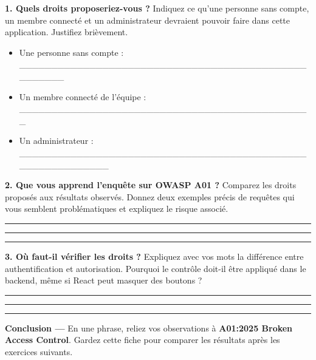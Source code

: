 \documentclass[
  french,
  10pt,
  a4paper,
]{article}
\providecommand{\tightlist}{%
  \setlength{\itemsep}{0pt}\setlength{\parskip}{0pt}}
\begin{document}
\textbf{1. Quels droits proposeriez-vous ?} Indiquez ce qu'une personne
sans compte, un membre connecté et un administrateur devraient pouvoir
faire dans cette application. Justifiez brièvement.

\begin{itemize}
\tightlist
\item
  Une personne sans compte :
  \_\_\_\_\_\_\_\_\_\_\_\_\_\_\_\_\_\_\_\_\_\_\_\_\_\_\_\_\_\_\_\_\_\_\_\_\_\_\_\_\_\_\_\_\_\_\_\_\_\_\_\_
\item
  Un membre connecté de l'équipe :
  \_\_\_\_\_\_\_\_\_\_\_\_\_\_\_\_\_\_\_\_\_\_\_\_\_\_\_\_\_\_\_\_\_\_\_\_\_\_\_\_\_\_\_\_\_\_
\item
  Un administrateur :
  \_\_\_\_\_\_\_\_\_\_\_\_\_\_\_\_\_\_\_\_\_\_\_\_\_\_\_\_\_\_\_\_\_\_\_\_\_\_\_\_\_\_\_\_\_\_\_\_\_\_\_\_\_\_\_\_\_\_\_
\end{itemize}

\textbf{2. Que vous apprend l'enquête sur OWASP A01 ?} Comparez les
droits proposés aux résultats observés. Donnez deux exemples précis de
requêtes qui vous semblent problématiques et expliquez le risque
associé.

\begin{center}\rule{0.5\linewidth}{0.5pt}\end{center}

\begin{center}\rule{0.5\linewidth}{0.5pt}\end{center}

\begin{center}\rule{0.5\linewidth}{0.5pt}\end{center}

\textbf{3. Où faut-il vérifier les droits ?} Expliquez avec vos mots la
différence entre authentification et autorisation. Pourquoi le contrôle
doit-il être appliqué dans le backend, même si React peut masquer des
boutons ?

\begin{center}\rule{0.5\linewidth}{0.5pt}\end{center}

\begin{center}\rule{0.5\linewidth}{0.5pt}\end{center}

\begin{center}\rule{0.5\linewidth}{0.5pt}\end{center}

\textbf{Conclusion ---} En une phrase, reliez vos observations à
\textbf{A01:2025 Broken Access Control}. Gardez cette fiche pour
comparer les résultats après les exercices suivants.
\end{document}
